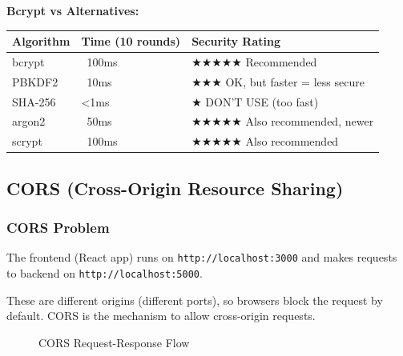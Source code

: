 \documentclass[12pt,a4paper,oneside]{article}
\begin{document}
\textbf{Bcrypt vs Alternatives:}

\begin{table}[H]
\centering
\begin{tabular}{|p{2.5cm}|p{2.5cm}|p{7cm}|}
\hline
\textbf{Algorithm} & \textbf{Time (10 rounds)} & \textbf{Security Rating} \\
\hline
bcrypt & ~100ms & ★★★★★ Recommended \\
\hline
PBKDF2 & ~10ms & ★★★ OK, but faster = less secure \\
\hline
SHA-256 & <1ms & ★ DON'T USE (too fast) \\
\hline
argon2 & ~50ms & ★★★★★ Also recommended, newer \\
\hline
scrypt & ~100ms & ★★★★★ Also recommended \\
\hline
\end{tabular}
\end{table}

\subsection{CORS (Cross-Origin Resource Sharing)}

\subsubsection{CORS Problem}

The frontend (React app) runs on \texttt{http://localhost:3000} and makes requests to backend on \texttt{http://localhost:5000}.

These are different origins (different ports), so browsers block the request by default. CORS is the mechanism to allow cross-origin requests.

\begin{figure}[H]
\centering
{}
\caption{CORS Request-Response Flow}
\label{fig:cors}
\end{figure}
\end{document}
